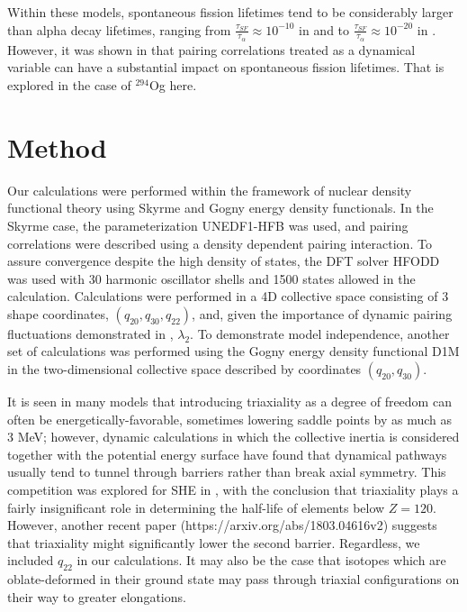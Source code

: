 Within these models, spontaneous fission lifetimes tend to be considerably larger than alpha decay lifetimes, ranging from $\frac{\tau_{SF}}{\tau_{\alpha}}\approx10^{-10}$ in \cite{Baran2015} and \cite{Reinhard2017} to $\frac{\tau_{SF}}{\tau_{\alpha}}\approx10^{-20}$ in \cite{Warda2012}. However, it was shown in \cite{Sadhukhan2014} that pairing correlations treated as a dynamical variable can have a substantial impact on spontaneous fission lifetimes. That is explored in the case of $^{294}$Og here.

\section{Method}

Our calculations were performed within the framework of nuclear density functional theory using Skyrme and Gogny energy density functionals. In the Skyrme case, the parameterization UNEDF1-HFB \cite{Schunck2015} was used, and pairing correlations were described using a density dependent pairing interaction. To assure convergence despite the high density of states, the DFT solver HFODD was used with 30 harmonic oscillator shells and 1500 states allowed in the calculation. Calculations were performed in a 4D collective space consisting of 3 shape coordinates, $(q_{20}, q_{30}, q_{22})$, and, given the importance of dynamic pairing fluctuations demonstrated in \cite{Sadhukhan2014}, $\lambda_2$. To demonstrate model independence, another set of calculations was performed using the Gogny energy density functional D1M in the two-dimensional collective space described by coordinates $(q_{20},q_{30})$.

It is seen in many models that introducing triaxiality as a degree of freedom can often be energetically-favorable, sometimes lowering saddle points by as much as 3 MeV; however, dynamic calculations in which the collective inertia is considered together with the potential energy surface have found that dynamical pathways usually tend to tunnel through barriers rather than break axial symmetry. This competition was explored for SHE in \cite{Gherghescu1999}, with the conclusion that triaxiality plays a fairly insignificant role in determining the half-life of elements below $Z=120$. However, another recent paper (https://arxiv.org/abs/1803.04616v2) suggests that triaxiality might significantly lower the second barrier. Regardless, we included $q_{22}$ in our calculations. It may also be the case that isotopes which are oblate-deformed in their ground state may pass through triaxial configurations on their way to greater elongations.


